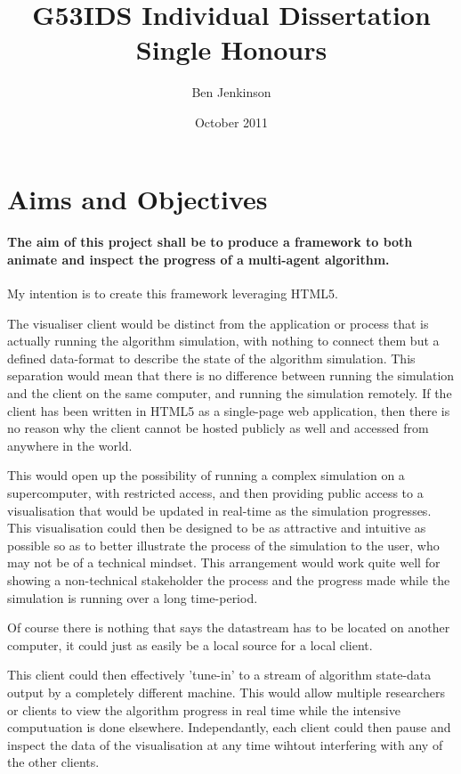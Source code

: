 \documentclass[a4paper]{article}
\title{G53IDS Individual Dissertation Single Honours}
\author{Ben Jenkinson}
\date{October 2011}
\begin{document}
	

	\section{Aims and Objectives}

		\paragraph{The aim of this project shall be to produce a framework to both animate and inspect the progress of a multi-agent algorithm.}

		My intention is to create this framework leveraging \textsc{HTML5}.

		The visualiser client would be distinct from the application or process that is actually running the algorithm simulation, with nothing to connect them but a defined data-format to describe the state of the algorithm simulation. This separation would mean that there is no difference between running the simulation and the client on the same computer, and running the simulation remotely. If the client has been written in HTML5 as a single-page web application, then there is no reason why the client cannot be hosted publicly as well and accessed from anywhere in the world.

		This would open up the possibility of running a complex simulation on a supercomputer, with restricted access, and then providing public access to a visualisation that would be updated in real-time as the simulation progresses. This visualisation could then be designed to be as attractive and intuitive as possible so as to better illustrate the process of the simulation to the user, who may not be of a technical mindset. This arrangement would work quite well for showing a non-technical stakeholder the process and the progress made while the simulation is running over a long time-period.

		Of course there is nothing that says the datastream has to be located on another computer, it could just as easily be a local source for a local client.

		This client could then effectively 'tune-in' to a stream of algorithm state-data output by a completely different machine. This would allow multiple researchers or clients to view the algorithm progress in real time while the intensive computuation is done elsewhere. Independantly, each client could then pause and inspect the data of the visualisation at any time wihtout interfering with any of the other clients.
\end{document}
